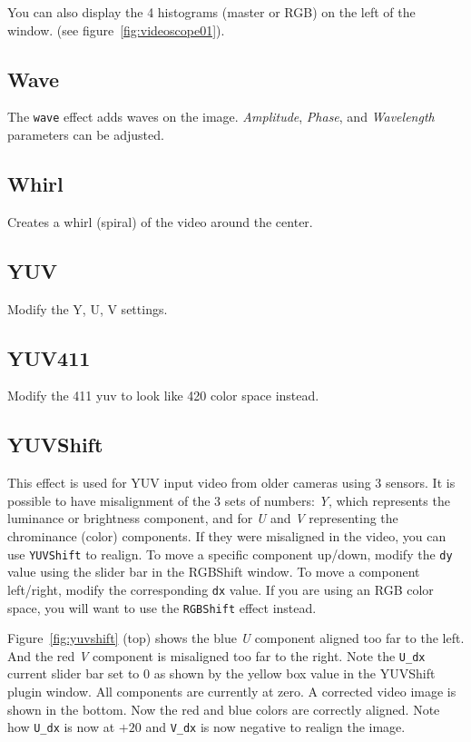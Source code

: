 You can also display the 4 histograms (master or RGB) on the left of the window. (see figure~\ref{fig:videoscope01}).

\subsection{Wave}%
\label{sub:wave}

The \texttt{wave} effect adds waves on the image. \textit{Amplitude}, \textit{Phase}, and \textit{Wavelength} parameters can be adjusted.

\subsection{Whirl}%
\label{sub:whirl}

Creates a whirl (spiral) of the video around the center.

\subsection{YUV}%
\label{sub:yuv}

Modify the Y, U, V settings.

\subsection{YUV411}%
\label{sub:yuv411}

Modify the 411 yuv to look like 420 color space instead.

\subsection{YUVShift}%
\label{sub:yuvshift}

This effect is used for YUV input video from older cameras using $3$ sensors. It is possible to have misalignment of the $3$ sets of numbers: \textit{Y}, which represents the luminance or brightness component, and for \textit{U} and \textit{V} representing the chrominance (color) components. If they were misaligned in the video, you can use \texttt{YUVShift} to realign. To move a specific component up/down, modify the \texttt{dy} value using the slider bar in the RGBShift window. To move a component left/right, modify the corresponding \texttt{dx} value. If you are using an RGB color space, you will want to use the \texttt{RGBShift} effect instead.

Figure~\ref{fig:yuvshift} (top) shows the blue \textit{U} component aligned too far to the left. And the red \textit{V} component is misaligned too far to the right. Note the \texttt{U\_dx} current slider bar set to $0$ as shown by the yellow box value in the YUVShift plugin window. All components are currently at zero.
A corrected video image is shown in the bottom. Now the red and blue colors are correctly aligned. Note how \texttt{U\_dx} is now at $+20$ and \texttt{V\_dx} is now negative to realign the image.

